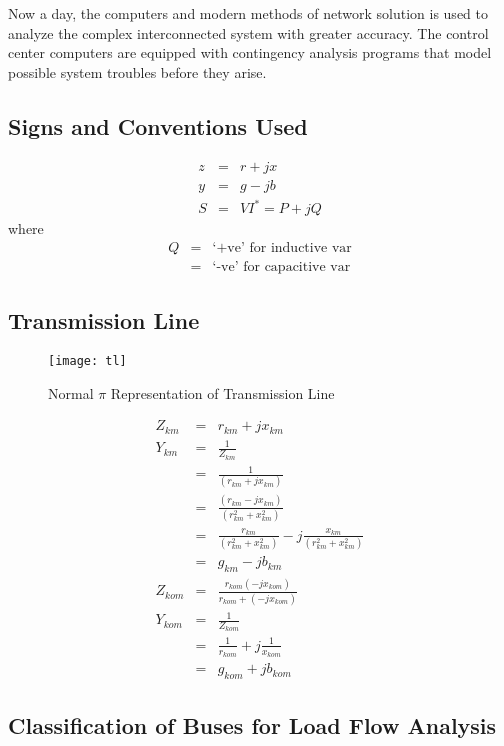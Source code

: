 \documentclass[a4paper,11pt]{article}
\begin{document}
Now a day, the computers and modern methods of network solution is used to analyze the complex interconnected system with greater accuracy. The control center computers are equipped with contingency analysis programs that model possible system troubles before they arise.

\subsection{Signs and Conventions Used}
\begin{eqnarray*}
z & = &  r + jx \\
y & = & g - jb \\
S & = & VI^{\ast} = P + jQ 
\end{eqnarray*}
where 
\begin{eqnarray*}
Q & = & \textrm{`+ve' for inductive var} \\
 & = & \textrm{`-ve' for capacitive var}
\end{eqnarray*}

\subsection{Transmission Line}

\begin{figure}[h]
\centering
\texttt{[image: tl]}
\caption{Normal $\pi$ Representation of Transmission Line} \label{2.1}
\end{figure}

\begin{eqnarray*}
Z_{km} & = & r_{km} + jx_{km} \\
Y_{km} & = & \frac{1}{Z_{km}} \\
	& = & \frac{1}{(r_{km} + jx_{km})} \\
	& = & \frac{(r_{km} - jx_{km})}{(r_{km}^2 + x_{km}^2)}\\
	& = & \frac{r_{km}}{(r_{km}^2+ x_{km}^2)} - j\frac{x_{km}}{(r_{km}^2 + x_{km}^2)}\\
	& = & g_{km}- jb_{km} \\
Z_{kom} & = & \frac{r_{kom}(-jx_{kom})}{r_{kom} + (-jx_{kom})} \\
Y_{kom} & = & \frac{1}{Z_{kom}}\\
	& = & \frac{1}{r_{kom}} + j\frac{1}{x_{kom}}\\
	& = & g_{kom} + jb_{kom}
\end{eqnarray*}

\subsection{Classification of Buses for Load Flow Analysis}
\end{document}
